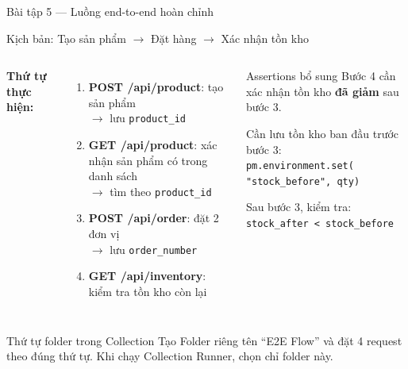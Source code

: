 \documentclass[aspectratio=169,10pt]{beamer}
\begin{document}
\begin{frame}{Bài tập 5 --- Luồng end-to-end hoàn chỉnh}
  \begin{block}{Kịch bản: Tạo sản phẩm $\to$ Đặt hàng $\to$ Xác nhận tồn kho}
  \end{block}

  \vspace{0.3em}
  \begin{columns}
    \textbf{Thứ tự thực hiện:}
    \begin{enumerate}
      \item \textbf{POST /api/product}: tạo sản phẩm\\
        $\to$ lưu \texttt{product\_id}
      \item \textbf{GET /api/product}: xác nhận sản phẩm có trong danh sách\\
        $\to$ tìm theo \texttt{product\_id}
      \item \textbf{POST /api/order}: đặt 2 đơn vị\\
        $\to$ lưu \texttt{order\_number}
      \item \textbf{GET /api/inventory}: kiểm tra tồn kho còn lại
    \end{enumerate}

    \begin{block}{Assertions bổ sung}
      Bước 4 cần xác nhận tồn kho \textbf{đã giảm} sau bước 3.

      \vspace{0.3em}
      Cần lưu tồn kho ban đầu trước bước 3:\\
      \texttt{pm.environment.set(}\\
      \quad\texttt{"stock\_before", qty)}

      \vspace{0.3em}
      Sau bước 3, kiểm tra:\\
      \texttt{stock\_after < stock\_before}
    \end{block}
  \end{columns}

  \vspace{0.3em}
  \begin{alertblock}{Thứ tự folder trong Collection}
    Tạo Folder riêng tên ``E2E Flow'' và đặt 4 request theo đúng thứ tự.
    Khi chạy Collection Runner, chọn chỉ folder này.
  \end{alertblock}
\end{frame}
\end{document}
